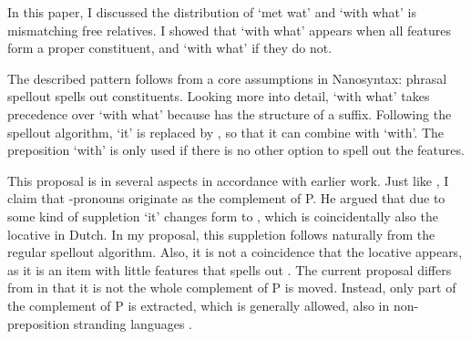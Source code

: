 \documentclass{article}
\begin{document}
In this paper, I discussed the distribution of  `met wat' and  `with what' is mismatching free relatives. I showed that  `with what' appears when all features form a proper constituent, and  `with what' if they do not.

The described pattern follows from a core assumptions in Nanosyntax: phrasal spellout spells out constituents. Looking more into detail,  `with what' takes precedence over  `with what' because  has the structure of a suffix. Following the spellout algorithm,  `it' is replaced by , so that it can combine with  `with'. The preposition  `with' is only used if there is no other option to spell out the features.

This proposal is in several aspects in accordance with earlier work.
Just like \citet{riemsdijk1978}, I claim that -pronouns originate as the complement of P. He argued that due to some kind of suppletion  `it' changes form to , which is coincidentally also the locative in Dutch. In my proposal, this suppletion follows naturally from the regular spellout algorithm. Also, it is not a coincidence that the locative appears, as it is an item with little features that spells out .
The current proposal differs from \citet{riemsdijk1978} in that it is not the whole complement of P is moved. Instead, only part of the complement of P is extracted, which is generally allowed, also in non-preposition stranding languages \citep{abels2003diss}.



\printbibliography
\end{document}
